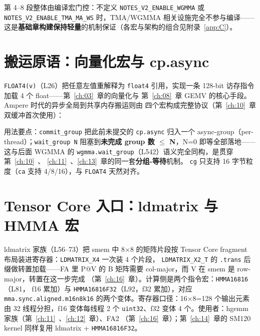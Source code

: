 第 4--8 段整体由编译宏门控：不定义 \texttt{NOTES\_\allowbreak{}V2\_\allowbreak{}ENABLE\_\allowbreak{}WGMMA} 或
\texttt{NOTES\_\allowbreak{}V2\_\allowbreak{}ENABLE\_\allowbreak{}TMA\_\allowbreak{}MA\_\allowbreak{}WS} 时，TMA/WGMMA 相关设施完全不参与编译——
这是\textbf{基础章构建保持轻量}的机制保证（各宏与架构的组合见附录~\ref{app:C}）。

\section{搬运原语：向量化宏与 cp.async}

\texttt{FLOAT4(v)}（L26）把任意左值重解释为 \texttt{float4} 引用，实现一条
128-bit 访存指令加载 4 个 float——第~\ref{ch:03}~章的向量化与
第~\ref{ch:08}~章 GEMV 的核心手段。Ampere 时代的异步全局到共享内存搬运则由
四个宏构成完整协议（第~\ref{ch:10}~章双缓冲首次使用）：



用法要点：\texttt{commit\_\allowbreak{}group} 把此前未提交的 \texttt{cp.async} 归入一个
async-group（per-thread）；\texttt{wait\_\allowbreak{}group~N} 阻塞到\textbf{未完成 group 数
$\le$ N}，N=0 即等全部落地——这与后面 WGMMA 的
\texttt{wgmma.\allowbreak{}wait\_\allowbreak{}group}（L542）语义完全同构，是贯穿第~\ref{ch:10}~、
\ref{ch:11}~、\ref{ch:13}~章的同一套\textbf{分组-等待}机制。
\texttt{cg} 只支持 16 字节粒度（\texttt{ca} 支持 4/8/16），与 \texttt{FLOAT4}
天然对齐。

\section{Tensor Core 入口：ldmatrix 与 HMMA 宏}

ldmatrix 家族（L56--73）把 smem 中 8$\times$8 的矩阵片段按 Tensor Core
fragment 布局装进寄存器：\texttt{LDMATRIX\_X4} 一次装 4 个片段，
\texttt{LDMATRIX\_\allowbreak{}X2\_\allowbreak{}T} 的 \texttt{.trans} 后缀做转置加载——FA 里 P@V 的
B 矩阵需要 col-major，而 V 在 smem 是 row-major，转置在这一步完成
（第~\ref{ch:16}~章）。计算侧是两个指令宏：\texttt{HMMA16816}（L81，
f16 累加）与 \texttt{HMMA16816\allowbreak{}F32}（L92，f32 累加），对应
\texttt{mma.\allowbreak{}sync.\allowbreak{}aligned.\allowbreak{}m16n8k16} 的两个变体。寄存器口径：16$\times$8=128
个输出元素由 32 线程分担，f16 变体每线程 2 个 \texttt{uint32}、f32 变体
4 个。使用者：hgemm 家族（第~\ref{ch:11}~、\ref{ch:12}~章）、FA2
（第~\ref{ch:16}~章）；第~\ref{ch:14}~章的 SM120 kernel 同样复用
ldmatrix + \texttt{HMMA16816\allowbreak{}F32}。

